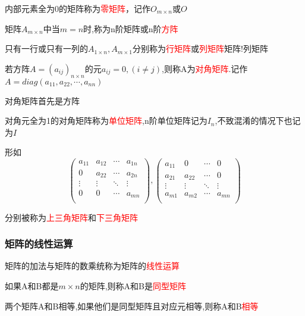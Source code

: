 内部元素全为0的矩阵称为\textcolor{red}{零矩阵}，记作$O_{m\times n}$或$O$

矩阵$A_{m\times n}$中当$m=n$时,称为n阶矩阵或n阶\textcolor{red}{方阵}

只有一行或只有一列的$A_{1\times n},A_{m\times 1}$分别称为\textcolor{red}{行矩阵}或\textcolor{red}{列矩阵}{矩阵!列矩阵}

若方阵$A=(a_{ij})_{n\times n}$的元$a_{ij}=0,(i\neq j)$,则称A为\textcolor{red}{对角矩阵}.记作$A=diag(a_{11},a_{22},\cdots,a_{nn})$

\begin{note}
	对角矩阵首先是方阵
\end{note}

对角元全为1的对角矩阵称为\textcolor{red}{单位矩阵},n阶单位矩阵记为$I_n$,不致混淆的情况下也记为$I$

形如
\begin{equation*}
\begin{pmatrix}
		a_{11} &a_{12}&\cdots&a_{1n}\\
	0&a_{22}&\cdots&a_{2n}\\
	\vdots&\vdots&\ddots&\vdots\\
	0&0&\cdots&a_{mn}\\
\end{pmatrix},
\begin{pmatrix}
		a_{11} &0&\cdots&0\\
	a_{21}&a_{22}&\cdots&0\\
	\vdots&\vdots&\ddots&\vdots\\
	a_{m1}&a_{m2}&\cdots&a_{mn}\\
\end{pmatrix}
\end{equation*}

分别被称为\textcolor{red}{上三角矩阵}和\textcolor{red}{下三角矩阵}

\subsubsection{矩阵的线性运算}

矩阵的加法与矩阵的数乘统称为矩阵的\textcolor{red}{线性运算}

如果A和B都是$m\times n$的矩阵,则称A和B是\textcolor{red}{同型矩阵}

两个矩阵A和B相等,如果他们是同型矩阵且对应元相等,则称A和B\textcolor{red}{相等}

